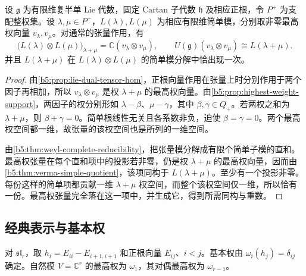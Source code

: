\begin{proposition}[张量积中的最高权分量]\label{b5:prop:highest-tensor-component}
	设 \(\mathfrak g\) 为有限维复半单 Lie 代数，固定 Cartan 子代数 \(\mathfrak h\) 及相应正根，令 \(P^+\) 为支配整权集。设 \(\lambda,\mu\in P^+\)，\(L(\lambda),L(\mu)\) 为相应有限维简单模，分别取非零最高权向量 \(v_\lambda,v_\mu\)。对通常的张量作用，有
	\[
		\bigl(L(\lambda)\otimes L(\mu)\bigr)_{\lambda+\mu} =\mathbb C(v_\lambda\otimes v_\mu), \qquad U(\mathfrak g)(v_\lambda\otimes v_\mu)\cong L(\lambda+\mu).
	\]
	并且 \(L(\lambda+\mu)\) 在 \(L(\lambda)\otimes L(\mu)\) 的简单模分解中恰出现一次。
\end{proposition}
\begin{proof}
	由\cref{b5:prop:lie-dual-tensor-hom}，正根向量作用在张量上时分别作用于两个因子再相加，所以 \(v_\lambda\otimes v_\mu\) 是权 \(\lambda+\mu\) 的最高权向量。由\cref{b5:prop:highest-weight-support}，两因子的权分别形如 \(\lambda-\beta\)、\(\mu-\gamma\)，其中 \(\beta,\gamma\in Q_+\)。若两权之和为 \(\lambda+\mu\)，则 \(\beta+\gamma=0\)。简单根线性无关且各系数非负，迫使 \(\beta=\gamma=0\)。两个最高权空间都一维，故张量的该权空间也是所列的一维空间。

	由\cref{b5:thm:weyl-complete-reducibility}，把张量模分解成有限个简单子模的直和。最高权张量在每个直和项中的投影若非零，仍是权 \(\lambda+\mu\) 的最高权向量，因而由\cref{b5:thm:verma-simple-quotient}，该项同构于 \(L(\lambda+\mu)\)。至少有一个投影非零。每份这样的简单项都贡献一维 \(\lambda+\mu\) 权空间，而整个该权空间仅一维，所以恰有一份。最高权张量完全落在这一项中，并生成它，得到所需同构与重数。
\end{proof}

\subsection{经典表示与基本权}
\label{b5:subsec:1804:03}

对 \(\mathfrak{sl}_r\)，取 \(h_i=E_{ii}-E_{i+1,i+1}\) 和正根向量 \(E_{ij}\)、\(i<j\)。基本权由 \(\omega_i(h_j)=\delta_{ij}\) 确定。自然模 \(V=\mathbb C^r\) 的最高权为 \(\omega_1\)，其对偶最高权为 \(\omega_{r-1}\)。

